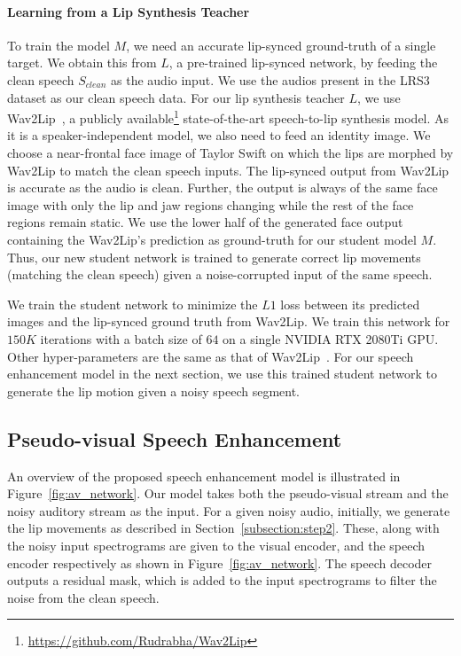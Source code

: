 \documentclass[10pt,twocolumn,letterpaper]{article}
\begin{document}
\paragraph{Learning from a Lip Synthesis Teacher}
To train the model $M$, we need an accurate lip-synced ground-truth of a single target. We obtain this from $L$, a pre-trained lip-synced network, by feeding the clean speech $S_{clean}$ as the audio input. We use the audios present in the LRS3~\cite{Afouras18d} dataset as our clean speech data. For our lip synthesis teacher $L$, we use Wav2Lip~\cite{wav2lip:2020}, a publicly available\footnote{\url{https://github.com/Rudrabha/Wav2Lip}} state-of-the-art speech-to-lip synthesis model. As it is a speaker-independent model, we also need to feed an identity image. We choose a near-frontal face image of Taylor Swift on which the lips are morphed by Wav2Lip to match the clean speech inputs. The lip-synced output from Wav2Lip is accurate as the audio is clean. Further, the output is always of the same face image with only the lip and jaw regions changing while the rest of the face regions remain static. We use the lower half of the generated face output containing the Wav2Lip's prediction as ground-truth for our student model $M$. Thus, our new student network is trained to generate correct lip movements (matching the clean speech) given a noise-corrupted input of the same speech. 

We train the student network to minimize the $L1$ loss between its predicted images and the lip-synced ground truth from Wav2Lip. We train this network for $150K$ iterations with a batch size of $64$ on a single NVIDIA RTX 2080Ti GPU. Other hyper-parameters are the same as that of Wav2Lip~\cite{wav2lip:2020}. For our speech enhancement model in the next section, we use this trained student network to generate the lip motion given a noisy speech segment.
 


\subsection{Pseudo-visual Speech Enhancement}
\label{subsection:step3}

An overview of the proposed speech enhancement model is illustrated in Figure~\ref{fig:av_network}. Our model takes both the pseudo-visual stream and the noisy auditory stream as the input. For a given noisy audio, initially, we generate the lip movements as described in Section~\ref{subsection:step2}. These, along with the noisy input spectrograms are given to the visual encoder, and the speech encoder respectively as shown in Figure~\ref{fig:av_network}. The speech decoder outputs a residual mask, which is added to the input spectrograms to filter the noise from the clean speech.
\end{document}
